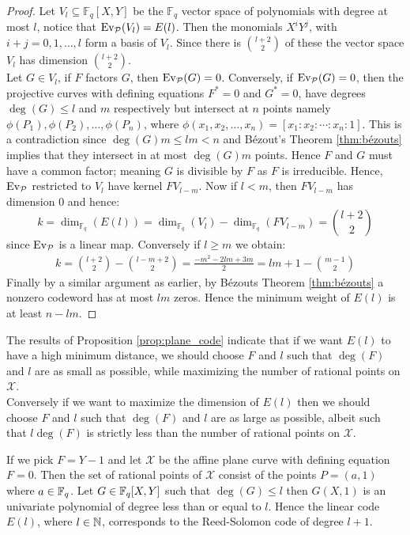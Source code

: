 \begin{proof}
  Let $V_{l} \subseteq \mathbb{F}_{q}[X, Y]$ be the $\mathbb{F}_{q}$ vector space of polynomials with degree at most $l$, notice that $\textnormal{Ev}_\mathcal{P}(V_{l}) = E(l)$. Then the monomials $X^{i}Y^{j}$, with $i + j = 0, 1, \ldots, l$ form a basis of $V_{l}$. Since there is $\binom{l + 2}{2}$ of these the vector space $V_{l}$ has dimension $\binom{l + 2}{2}$. \\
  Let $G \in V_{l}$, if $F$ factors $G$, then $\textnormal{Ev}_\mathcal{P}(G) = 0$. Conversely, if $\textnormal{Ev}_\mathcal{P}(G) = 0$, then the projective curves with defining equations $F^{*} = 0$ and $G^{*} = 0$, have degrees $\deg(G) \leq l$ and $m$ respectively but intersect at $n$ points namely $\phi(P_{1}), \phi(P_{2}), \ldots, \phi(P_{n})$, where $\phi(x_1, x_2, \ldots, x_{n}) = [x_1: x_2 : \cdots :  x_{n} : 1]$. This is a contradiction since $\deg(G)m \leq lm < n$ and Bézout's Theorem \ref{thm:bézouts} implies that they intersect in at most $\deg(G)m$ points. Hence $F$ and $G$ must have a common factor; meaning $G$ is divisible by $F$ as $F$ is irreducible. Hence, $\textnormal{Ev}_\mathcal{P}$ restricted to $V_{l}$ have kernel $FV_{l - m}$. Now if $l < m$, then $FV_{l - m}$ has dimension $0$ and hence:
  \begin{equation*}
    k = \dim_{\mathbb{F}_{q}}(E(l)) = \dim_{\mathbb{F}_{q}}(V_l) - \dim_{\mathbb{F}_{q}}(FV_{l - m}) = \binom{l + 2}{2}
  \end{equation*}
  since $\textnormal{Ev}_\mathcal{P}$ is a linear map. Conversely if $l \geq m$ we obtain:
  \begin{align*}
    k = \binom{l + 2}{2} - \binom{l - m + 2}{2} = \frac{-m^{2} - 2lm + 3m}{2} = lm + 1 - \binom{m - 1}{2}
  \end{align*}
  Finally by a similar argument as earlier, by Bézouts Theorem \ref{thm:bézouts} a nonzero codeword has at most $lm$ zeros. Hence the minimum weight of $E(l)$ is at least $n - lm$.
\end{proof}

The results of Proposition \ref{prop:plane_code} indicate that if we want $E(l)$ to have a high minimum distance, we should choose $F$ and $l$ such that $\deg(F)$ and $l$ are as small as possible, while maximizing the number of rational points on $\mathcal{X}$. \\
Conversely if we want to maximize the dimension of $E(l)$ then we should choose $F$ and $l$ such that $\deg(F)$ and $l$ are as large as possible, albeit such that $l\deg(F)$ is strictly less than the number of rational points on $\mathcal{X}$.

\begin{example}\label{exmp:code_from_plane_curve_rs}
  If we pick $F = Y - 1$ and let $\mathcal{X}$ be the affine plane curve with defining equation $F = 0$. Then the set of rational points of $\mathcal{X}$ consist of the points $P = (a, 1)$ where $a \in \mathbb{F}_{q}$. Let $G \in \mathbb{F}_{q}[X, Y]$ such that $\deg(G) \leq l$ then $G(X, 1)$ is an univariate polynomial of degree less than or equal to $l$. Hence the linear code $E(l)$, where $l \in \mathbb{N}$, corresponds to the Reed-Solomon code of degree $l + 1$.
\end{example}
